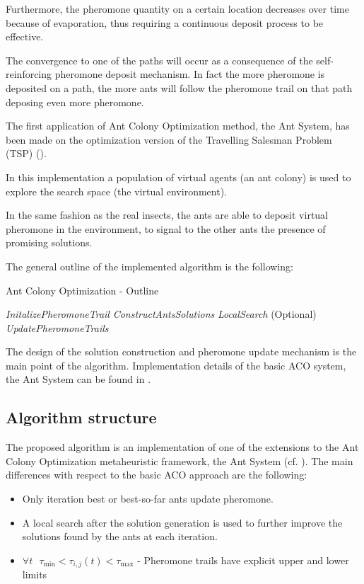 \begin{homeworkProblem}
Furthermore, the pheromone quantity on a certain location decreases over time because of evaporation, thus requiring a continuous deposit process to be effective.

The convergence to one of the paths will occur as a consequence of the self-reinforcing pheromone deposit mechanism.
In fact the more pheromone is deposited on a path, the more ants will follow the pheromone trail on that path deposing even more pheromone.

The first application of Ant Colony Optimization method, the Ant System, has been made on the optimization version of the Travelling Salesman Problem (TSP) (\cite{dorigo1996ant}).

In this implementation a population of virtual agents (an ant colony) is used to explore the search space (the virtual environment).

In the same fashion as the real insects, the ants are able to deposit virtual pheromone in the environment, to signal to the other ants the presence of promising solutions.

The general outline of the implemented algorithm is the following: 

\begin{algorithm}[!h]
  \caption{Ant Colony Optimization - Outline}\label{aco:outline}
  \begin{algorithmic}[1]
    \State \emph{InitalizePheromoneTrail} 
        \State \emph{ConstructAntsSolutions}
        \State \emph{LocalSearch} (Optional)
        \State \emph{UpdatePheromoneTrails}
    \EndWhile
\end{algorithmic}
\end{algorithm}

The design of the solution construction and pheromone update mechanism is the main point of the algorithm.
Implementation details of the basic ACO system, the Ant System can be found in \cite{dorigo2006artificial}.

\subsection{Algorithm structure} \label{sec:algstrucACO}
The proposed algorithm is an implementation of one of the extensions to the Ant Colony Optimization metaheuristic framework, the \maxmin Ant System (cf. \cite{stutzle2000max}).
The main differences with respect to the basic ACO approach are the following:
\begin{itemize}
  \item Only iteration best or best-so-far ants update pheromone.
  \item A local search after the solution generation is used to further improve the solutions found by the ants at each iteration.
  \item $\forall t \text{ } \tau_{\min} < \tau_{i,j}(t) < \tau_{\max}  $ - Pheromone trails have explicit upper and lower limits
\end{itemize}


\end{homeworkProblem}
